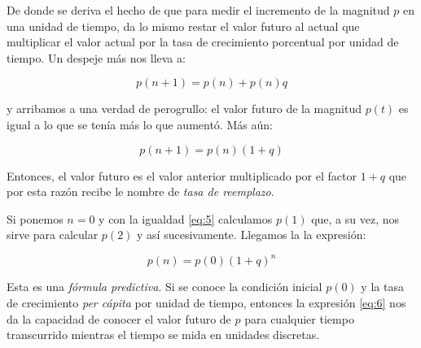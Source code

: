 De donde se deriva el hecho de que para medir el incremento de la magnitud $p$ en una unidad de tiempo, da lo mismo restar el valor futuro al actual que multiplicar el valor actual por la tasa de crecimiento porcentual por unidad de tiempo. Un despeje más nos lleva a:

 \begin{equation} \label{eq:4}
 p(n+1)=p(n)+p(n)q
\end{equation}

\noindent y arribamos a una verdad de perogrullo: el valor futuro de la magnitud $p(t)$ es igual a lo que se tenía más lo que aumentó. Más aún:

 \begin{equation} \label{eq:5}
 p(n+1)=p(n)(1+q)
\end{equation}

Entonces, el valor futuro es el valor anterior multiplicado por el factor $1+q$ que por esta razón recibe le nombre de \emph{tasa de reemplazo}.

Si ponemos $n=0$ y con la igualdad \ref{eq:5} calculamos $p(1)$ que, a su vez, nos sirve para calcular $p(2)$ y así sucesivamente. Llegamos la la expresión:

 \begin{equation} \label{eq:6}
 p(n)=p(0)(1+q)^n
\end{equation}

Esta es una \emph{fórmula predictiva}. Si se conoce la condición inicial $p(0)$ y la tasa de crecimiento \emph{per cápita} por unidad de tiempo, entonces la expresión \ref{eq:6} nos da la capacidad de conocer el valor futuro de $p$ para cualquier tiempo transcurrido mientras el tiempo se mida en unidades discretas.

